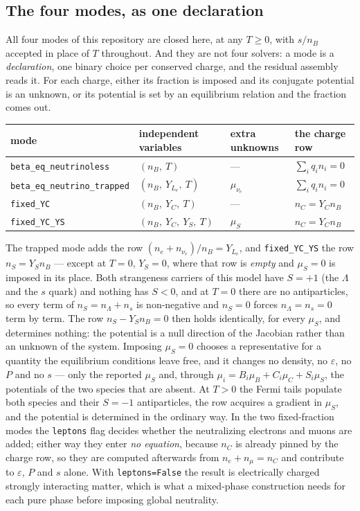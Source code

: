\documentclass[aps,prc,onecolumn,superscriptaddress,nofootinbib,10pt]{revtex4-2}
\newcommand{\nB}{n_B}
\newcommand{\nC}{n_C}
\newcommand{\nS}{n_S}
\newcommand{\muB}{\mu_B}
\newcommand{\muC}{\mu_C}
\newcommand{\muS}{\mu_S}
\begin{document}
\subsection{The four modes, as one declaration}
\label{sec:beta}

All four modes of this repository are closed here, at any $T \ge 0$, with
$s/\nB$ accepted in place of $T$ throughout. And they are not four solvers: a
mode is
a \emph{declaration}, one binary choice per conserved charge, and the residual
assembly reads it. For each charge, either its fraction is imposed and its
conjugate potential is an unknown, or its potential is set by an equilibrium
relation and the fraction comes out.

\begin{center}
\begin{tabular}{llll}
\toprule
mode & independent variables & extra unknowns & the charge row \\
\midrule
\texttt{beta\_eq\_neutrinoless} & $(\nB,\ T)$ & --- &
  $\sum_i q_i n_i = 0$ \\
\texttt{beta\_eq\_neutrino\_trapped} & $(\nB,\ Y_{L_e},\ T)$
  & $\mu_{\nu_e}$ & $\sum_i q_i n_i = 0$ \\
\texttt{fixed\_YC} & $(\nB,\ Y_C,\ T)$ & --- & $\nC = Y_C \nB$ \\
\texttt{fixed\_YC\_YS} & $(\nB,\ Y_C,\ Y_S,\ T)$ & $\muS$
  & $\nC = Y_C \nB$ \\
\bottomrule
\end{tabular}
\end{center}

\noindent
The trapped mode adds the row $(n_e + n_{\nu_e})/\nB = Y_{L_e}$, and
\texttt{fixed\_YC\_YS} the row $\nS = Y_S \nB$ --- except at $T = 0$,
$Y_S = 0$, where that row is \emph{empty} and $\muS = 0$ is imposed in its
place. Both strangeness carriers of this model have $S = +1$ (the $\Lambda$
and the $s$ quark) and nothing has $S < 0$, and at $T = 0$ there are no
antiparticles, so every term of $\nS = n_\Lambda + n_s$ is non-negative and
$\nS = 0$ forces $n_\Lambda = n_s = 0$ term by term. The row
$\nS - Y_S \nB = 0$ then holds identically, for every $\muS$, and determines
nothing: the potential is a null direction of the Jacobian rather than an
unknown of the system. Imposing $\muS = 0$ chooses a representative for a
quantity the equilibrium conditions leave free, and it changes no density, no
$\varepsilon$, no $P$ and no $s$ --- only the reported $\muS$ and, through
$\mu_i = B_i \muB + C_i \muC + S_i \muS$, the potentials of the two species
that are absent. At $T > 0$ the Fermi tails populate both species and their
$S = -1$ antiparticles, the row acquires a gradient in $\muS$, and the
potential is determined in the ordinary way. In the two fixed-fraction
modes the \texttt{leptons} flag decides whether the neutralizing electrons and
muons are added; either way they enter \emph{no equation}, because $\nC$ is
already pinned by the charge row, so they are computed afterwards from
$n_e + n_\mu = \nC$ and contribute to $\varepsilon$, $P$ and $s$ alone. With
\texttt{leptons=False} the result is electrically charged strongly interacting
matter, which is what a mixed-phase construction needs for each pure phase
before imposing global neutrality.
\end{document}
